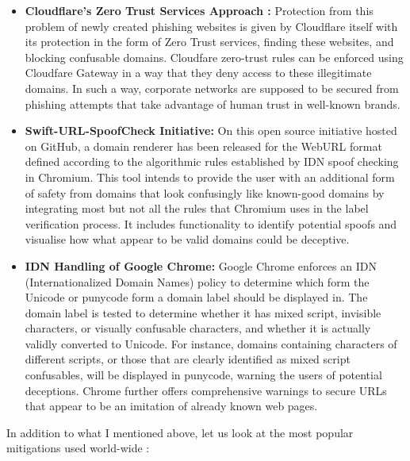 \begin{itemize}
    \item \textbf{Cloudflare's Zero Trust Services Approach :} Protection from this problem of newly created phishing websites is given by Cloudflare itself with its protection in the form of Zero Trust services, finding these websites, and blocking confusable domains. Cloudfare zero-trust rules can be enforced using Cloudfare Gateway in a way that they deny access to these illegitimate domains. In such a way, corporate networks are supposed to be secured from phishing attempts that take advantage of human trust in well-known brands. \cite{Cloudflare2023}

     \item \textbf{Swift-URL-SpoofCheck Initiative: } On this open source initiative hosted on GitHub, a domain renderer has been released for the WebURL format defined according to the algorithmic rules established by IDN spoof checking in Chromium. This tool intends to provide the user with an additional form of safety from domains that look confusingly like known-good domains by integrating most but not all the rules that Chromium uses in the label verification process. It includes functionality to identify potential spoofs and visualise how what appear to be valid domains could be deceptive. \cite{KarwaSwiftURLSpoofCheck}
     
     \item \textbf{IDN Handling of Google Chrome: } Google Chrome enforces an IDN (Internationalized Domain Names) policy to determine which form the Unicode or punycode form a domain label should be displayed in. The domain label is tested to determine whether it has mixed script, invisible characters, or visually confusable characters, and whether it is actually validly converted to Unicode. For instance, domains containing characters of different scripts, or those that are clearly identified as mixed script confusables, will be displayed in punycode, warning the users of potential deceptions. Chrome further offers comprehensive warnings to secure URLs that appear to be an imitation of already known web pages. \cite{ChromiumIDN}
     
\end{itemize}

In addition to what I mentioned above, let us look at the most popular mitigations used world-wide :

